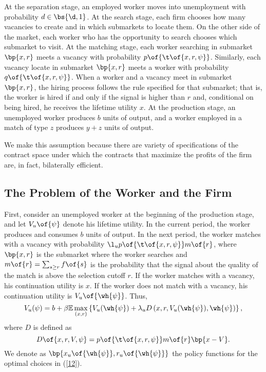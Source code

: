 \documentclass[12pt]{article}
\newcommand{\highlightR}[1]{{\emph{\color{MyRed}{#1}}}}
\theoremstyle{definition}
\begin{document}
At the separation stage, an employed worker moves into unemployment with probability $d \in \bs{\d, 1}$. At the search stage, each firm chooses how many vacancies to create and in which submarkets to locate them. On the other side of the market, each worker who has the opportunity to search chooses which submarket to visit. At the matching stage, each worker searching in submarket $\bp{x,r}$ meets a vacancy with probability $p\of{\t\of{x, r, \psi}}$. Similarly, each vacancy locate in submarket $\bp{x,r}$ meets a worker with probability $q\of{\t\of{x, r, \psi}}$. When a worker and a vacancy meet in submarket $\bp{x,r}$, the hiring process follows the rule specified for that submarket; that is, the worker is hired if and only if the signal is higher than $r$ and, conditional on being hired, he receives the lifetime utility $x$. At the production stage, an unemployed worker produces $b$ units of output, and a worker employed in a match of type $z$ produces $y+z$ units of output. 

\highlightR{We assume that the contracts offered by the firms to workers are bilaterally efficient in the sense that they maximize the joint value of the match, that is, the sum of the worker's lifetime utility and the firm's lifetime profits.} We make this assumption because there are variety of specifications of the contract space under which the contracts that maximize the profits of the firm are, in fact, bilaterally efficient. 

\subsection{The Problem of the Worker and the Firm}

First, consider an unemployed worker at the beginning of the production stage, and let $V_u\of{\psi}$ denote his lifetime utility. In the current period, the worker produces and consumes $b$ units of output. In the next period, the worker matches with a vacancy with probability $\l_u p\of{\t\of{x, r, \psi}} m\of{r}$, where $\bp{x, r}$ is the submarket where the worker searches and $m\of{r} = \sum_{s \geq r} f\of{s}$ is the probability that the signal about the quality of the match is above the selection cutoff $r$. If the worker matches with a vacancy, his continuation utility is $x$. If the worker does not match with a vacancy, his continuation utility is $V_u\of{\wh{\psi}}$. Thus, 
\begin{equation}
    \label{12}
    V_u(\psi)=b+\beta \mathbb{E} \max _{(x, r)}\left\{V_u(\wh{\psi})+\lambda_u D\left(x, r, V_u(\wh{\psi}), \wh{\psi}\right)\right\},
\end{equation}
where $D$ is defined as 
\begin{equation}
    \label{13}
    D\of{x, r, V, \psi} = p\of{\t\of{x, r, \psi}} m\of{r} \bp{x - V}. 
\end{equation}
We denote as $\bp{x_u\of{\wh{\psi}}, r_u\of{\wh{\psi}}}$ the policy functions for the optimal choices in (\ref{12}). 
\end{document}
